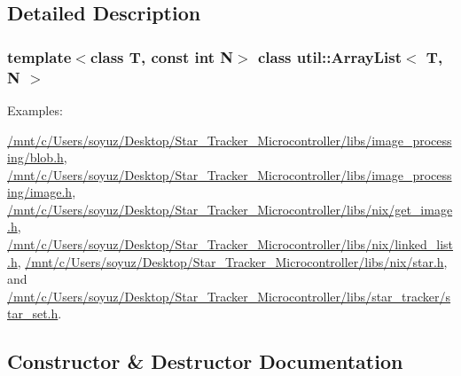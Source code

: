 \subsection{Detailed Description}
\subsubsection*{template$<$class T, const int N$>$\newline
class util\+::\+Array\+List$<$ T, N $>$}

\begin{Desc}
\item[Examples\+: ]\par
\hyperlink{_2mnt_2c_2Users_2soyuz_2Desktop_2Star_Tracker_Microcontroller_2libs_2image_processing_2blob_8h-example}{/mnt/c/\+Users/soyuz/\+Desktop/\+Star\+\_\+\+Tracker\+\_\+\+Microcontroller/libs/image\+\_\+processing/blob.\+h}, \hyperlink{_2mnt_2c_2Users_2soyuz_2Desktop_2Star_Tracker_Microcontroller_2libs_2image_processing_2image_8h-example}{/mnt/c/\+Users/soyuz/\+Desktop/\+Star\+\_\+\+Tracker\+\_\+\+Microcontroller/libs/image\+\_\+processing/image.\+h}, \hyperlink{_2mnt_2c_2Users_2soyuz_2Desktop_2Star_Tracker_Microcontroller_2libs_2nix_2get_image_8h-example}{/mnt/c/\+Users/soyuz/\+Desktop/\+Star\+\_\+\+Tracker\+\_\+\+Microcontroller/libs/nix/get\+\_\+image.\+h}, \hyperlink{_2mnt_2c_2Users_2soyuz_2Desktop_2Star_Tracker_Microcontroller_2libs_2nix_2linked_list_8h-example}{/mnt/c/\+Users/soyuz/\+Desktop/\+Star\+\_\+\+Tracker\+\_\+\+Microcontroller/libs/nix/linked\+\_\+list.\+h}, \hyperlink{_2mnt_2c_2Users_2soyuz_2Desktop_2Star_Tracker_Microcontroller_2libs_2nix_2star_8h-example}{/mnt/c/\+Users/soyuz/\+Desktop/\+Star\+\_\+\+Tracker\+\_\+\+Microcontroller/libs/nix/star.\+h}, and \hyperlink{_2mnt_2c_2Users_2soyuz_2Desktop_2Star_Tracker_Microcontroller_2libs_2star_tracker_2star_set_8h-example}{/mnt/c/\+Users/soyuz/\+Desktop/\+Star\+\_\+\+Tracker\+\_\+\+Microcontroller/libs/star\+\_\+tracker/star\+\_\+set.\+h}.\end{Desc}


\subsection{Constructor \& Destructor Documentation}
\mbox{\label{classutil_1_1ArrayList_ac1b4f10c45a0fb0fd56c6f923d209d9c}} 
